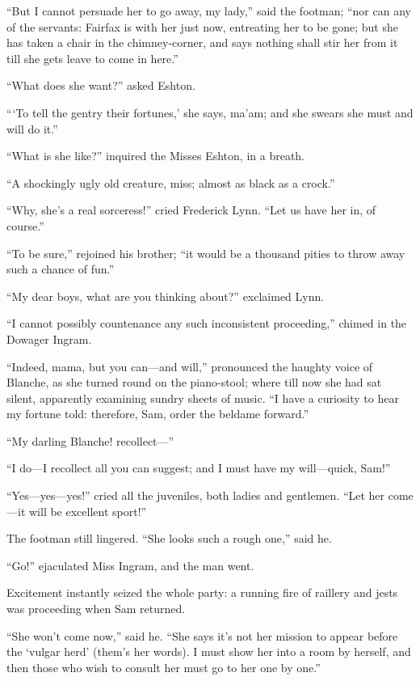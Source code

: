 \enquote{But I cannot persuade her to go away, my lady,} said the
footman; \enquote{nor can any of the servants: \Mrs{} Fairfax is with her
	just now, entreating her to be gone; but she has taken a chair in the
	chimney-corner, and says nothing shall stir her from it till she gets
	leave to come in here.}

\enquote{What does she want?} asked \Mrs{} Eshton.

\enquote{\enquote{To tell the gentry their fortunes,} she says, ma'am;
	and she swears she must and will do it.}

\enquote{What is she like?} inquired the Misses Eshton, in a breath.

\enquote{A shockingly ugly old creature, miss; almost as black as a
	crock.}

\enquote{Why, she's a real sorceress!} cried Frederick Lynn.
\enquote{Let us have her in, of course.}

\enquote{To be sure,} rejoined his brother; \enquote{it would be a
	thousand pities to throw away such a chance of fun.}

\enquote{My dear boys, what are you thinking about?} exclaimed \Mrs{}
Lynn.

\enquote{I cannot possibly countenance any such inconsistent
	proceeding,} chimed in the Dowager Ingram.

\enquote{Indeed, mama, but you can---and will,} pronounced the haughty
voice of Blanche, as she turned round on the piano-stool; where till now
she had sat silent, apparently examining sundry sheets of music.
\enquote{I have a curiosity to hear my fortune told: therefore, Sam,
	order the beldame forward.}

\enquote{My darling Blanche! recollect---}

\enquote{I do---I recollect all you can suggest; and I must have my
	will---quick, Sam!}

\enquote{Yes---yes---yes!} cried all the juveniles, both ladies and
gentlemen. \enquote{Let her come---it will be excellent sport!}

The footman still lingered. \enquote{She looks such a rough one,} said
he.

\enquote{Go!} ejaculated Miss Ingram, and the man went.

Excitement instantly seized the whole party: a running fire of raillery
and jests was proceeding when Sam returned.

\enquote{She won't come now,} said he. \enquote{She says it's not her
	mission to appear before the \enquote{vulgar herd} (them's her words).
	I must show her into a room by herself, and then those who wish to
	consult her must go to her one by one.}

